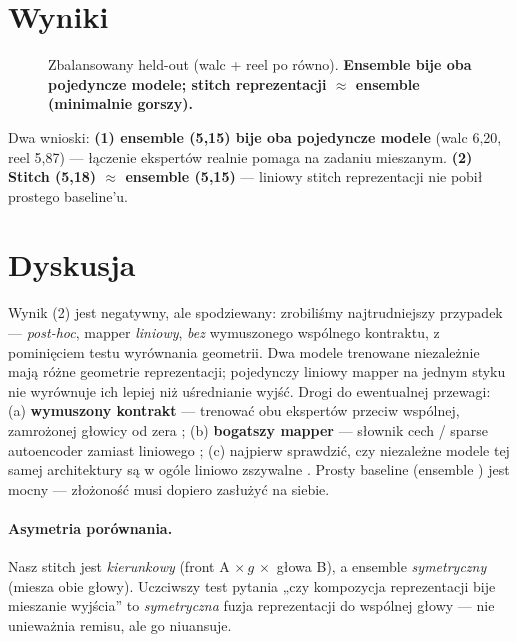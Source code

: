 \documentclass[11pt]{article}
\begin{document}
\section{Wyniki}
\begin{figure}[h]
\centering
{}
\caption{Zbalansowany held-out (walc + reel po równo). \textbf{Ensemble bije oba pojedyncze modele;
stitch reprezentacji $\approx$ ensemble (minimalnie gorszy).}}
\end{figure}

\noindent Dwa wnioski: \textbf{(1) ensemble (5{,}15) bije oba pojedyncze modele} (walc 6{,}20, reel 5{,}87) ---
łączenie ekspertów realnie pomaga na zadaniu mieszanym. \textbf{(2) Stitch (5{,}18) $\approx$ ensemble (5{,}15)}
--- liniowy stitch reprezentacji nie pobił prostego baseline'u.

\section{Dyskusja}
Wynik (2) jest negatywny, ale spodziewany: zrobiliśmy najtrudniejszy przypadek --- \emph{post-hoc}, mapper
\emph{liniowy}, \emph{bez} wymuszonego wspólnego kontraktu, z pominięciem testu wyrównania geometrii. Dwa modele
trenowane niezależnie mają różne geometrie reprezentacji; pojedynczy liniowy mapper na jednym styku nie wyrównuje
ich lepiej niż uśrednianie wyjść. Drogi do ewentualnej przewagi: (a) \textbf{wymuszony kontrakt} --- trenować obu
ekspertów przeciw wspólnej, zamrożonej głowicy od zera \cite{rebasin,zipit}; (b) \textbf{bogatszy mapper} ---
słownik cech / sparse autoencoder zamiast liniowego \cite{vqvae,sae}; (c) najpierw sprawdzić, czy niezależne
modele tej samej architektury są w ogóle liniowo zszywalne \cite{stitch15,bansal21}. Prosty baseline (ensemble
\cite{ensembles}) jest mocny --- złożoność musi dopiero zasłużyć na siebie.

\paragraph{Asymetria porównania.} Nasz stitch jest \emph{kierunkowy} (front A $\times\,g\,\times$ głowa B), a ensemble \emph{symetryczny} (miesza obie głowy). Uczciwszy test pytania „czy kompozycja reprezentacji bije mieszanie wyjścia'' to \emph{symetryczna} fuzja reprezentacji do wspólnej głowy --- nie unieważnia remisu, ale go niuansuje.
\end{document}
